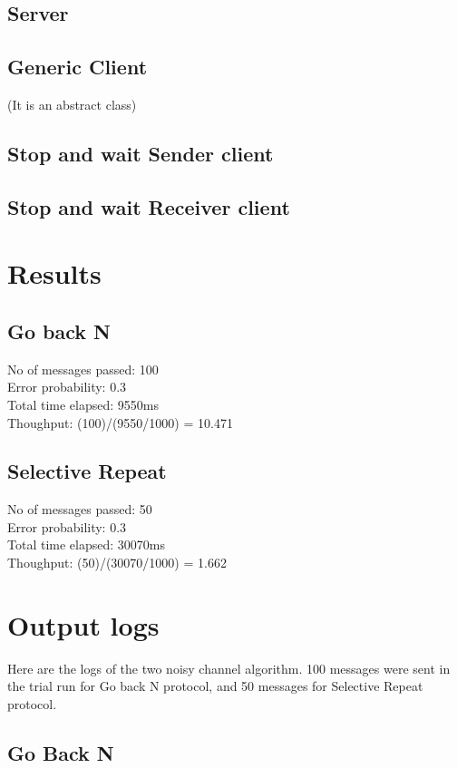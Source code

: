 \documentclass[14pt,titlepage, a4paper]{extarticle}
\begin{document}
\subsection{Server}

\subsection{Generic Client}
(It is an abstract class)

\subsection{Stop and wait Sender client}

\subsection{Stop and wait Receiver client}


\section{Results}

\subsection{Go back N}
No of messages passed: 100\\
Error probability: 0.3\\
Total time elapsed: 9550ms\\
Thoughput: (100)/(9550/1000) = 10.471

\subsection{Selective Repeat}
No of messages passed: 50\\
Error probability: 0.3\\
Total time elapsed: 30070ms\\
Thoughput: (50)/(30070/1000) = 1.662


\section{Output logs}
Here are the logs of the two noisy channel algorithm.
100 messages were sent in the trial run for Go back N protocol,
and 50 messages for Selective Repeat protocol.

\subsection{Go Back N}
\end{document}
